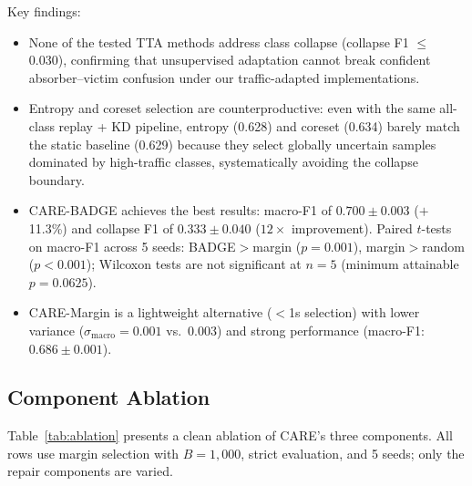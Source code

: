 \documentclass[journal]{IEEEtran}
\newcommand{\ours}{CARE}  %
\begin{document}
Key findings:
\begin{itemize}
  \item None of the tested TTA methods address class collapse (collapse F1 $\leq$0.030), confirming that unsupervised adaptation cannot break confident absorber--victim confusion under our traffic-adapted implementations.
  \item Entropy and coreset selection are counterproductive: even with the same all-class replay + KD pipeline, entropy (0.628) and coreset (0.634) barely match the static baseline (0.629) because they select globally uncertain samples dominated by high-traffic classes, systematically avoiding the collapse boundary.
  \item \ours{}-BADGE achieves the best results: macro-F1 of $0.700{\pm}0.003$ ($+$11.3\%) and collapse F1 of $0.333{\pm}0.040$ ($12{\times}$ improvement). Paired $t$-tests on macro-F1 across 5 seeds: BADGE${>}$margin ($p{=}0.001$), margin${>}$random ($p{<}0.001$); Wilcoxon tests are not significant at $n{=}5$ (minimum attainable $p{=}0.0625$).
  \item \ours{}-Margin is a lightweight alternative ($<$1s selection) with lower variance ($\sigma_{\text{macro}}{=}0.001$ vs.\ 0.003) and strong performance (macro-F1: $0.686{\pm}0.001$).
\end{itemize}

\subsection{Component Ablation}
\label{sec:ablation}

Table~\ref{tab:ablation} presents a clean ablation of \ours{}'s three components.
All rows use margin selection with $B{=}1{,}000$, strict evaluation, and 5 seeds; only the repair components are varied.
\end{document}
